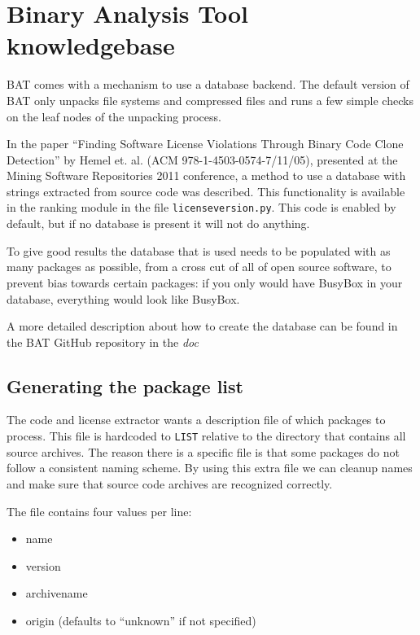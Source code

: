 \documentclass[10pt,a4paper]{article}
\begin{document}
\section{Binary Analysis Tool knowledgebase}

BAT comes with a mechanism to use a database backend. The default version of
BAT only unpacks file systems and compressed files and runs a few simple checks
on the leaf nodes of the unpacking process.

In the paper ``Finding Software License Violations Through Binary Code Clone
Detection'' by Hemel et. al. (ACM 978-1-4503-0574-7/11/05), presented at
the Mining Software Repositories 2011 conference, a method to use a database
with strings extracted from source code was described. This functionality is
available in the ranking module in the file \texttt{licenseversion.py}. This
code is enabled by default, but if no database is present it will not do
anything.

To give good results the database that is used needs to be populated with as
many packages as possible, from a cross cut of all of open source software, to
prevent bias towards certain packages: if you only would have BusyBox in your
database, everything would look like BusyBox.

A more detailed description about how to create the database can be found
in the BAT GitHub repository in the \textit{doc}

\subsection{Generating the package list}

The code and license extractor wants a description file of which packages to
process. This file is hardcoded to \texttt{LIST} relative to the directory that
contains all source archives. The reason there is a specific file is that some
packages do not follow a consistent naming scheme. By using this extra file we
can cleanup names and make sure that source code archives are recognized
correctly.

The file contains four values per line:

\begin{itemize}
\item name
\item version
\item archivename
\item origin (defaults to ``unknown'' if not specified)
\end{itemize}
\end{document}
